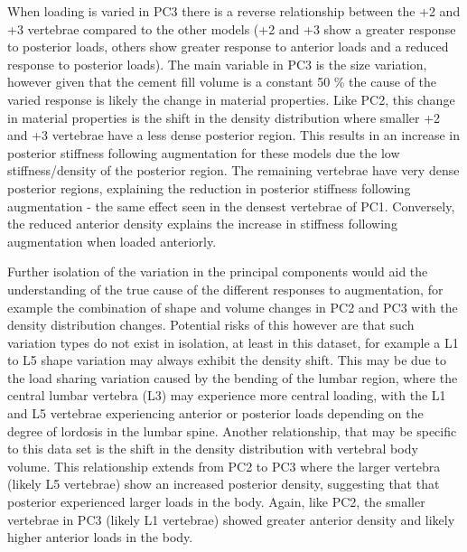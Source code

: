 When loading is varied in PC3 there is a reverse relationship between the +2
and +3 vertebrae compared to the other models (+2 and +3 show a greater
response to posterior loads, others show greater response to anterior loads and
a reduced response to posterior loads). The main variable in PC3 is the size
variation, however given that the cement fill volume is a constant 50 \% the
cause of the varied response is likely the change in material properties. Like
PC2, this change in material properties is the shift in the density
distribution where smaller +2 and +3 vertebrae have a less dense posterior
region. This results in an increase in posterior stiffness following
augmentation for these models due the low stiffness/density of the posterior
region. The remaining vertebrae have very dense posterior regions, explaining
the reduction in posterior stiffness following augmentation - the same effect
seen in the densest vertebrae of PC1. Conversely, the reduced anterior density
explains the increase in stiffness following augmentation when loaded
anteriorly.


Further isolation of the variation in the principal components would aid the
understanding of the true cause of the different responses to augmentation, for
example the combination of shape and volume changes in PC2 and PC3 with the
density distribution changes. Potential risks of this however are that such
variation types do not exist in isolation, at least in this dataset, for
example a L1 to L5 shape variation may always exhibit the density shift.  This
may be due to the load sharing variation caused by the bending of the lumbar
region, where the central lumbar vertebra (L3) may experience more central
loading, with the L1 and L5 vertebrae experiencing anterior or posterior loads
depending on the degree of lordosis in the lumbar spine.  Another relationship,
that may be specific to this data set is the shift in the density distribution
with vertebral body volume.  This relationship extends from PC2 to PC3 where
the larger vertebra (likely L5 vertebrae) show an increased posterior density,
suggesting that that posterior experienced larger loads in the body.  Again,
like PC2, the smaller vertebrae in PC3 (likely L1 vertebrae) showed greater
anterior density and likely higher anterior loads in the body.
